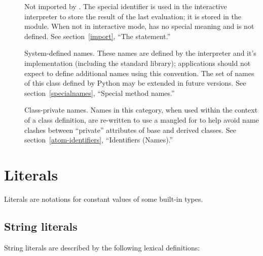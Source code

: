 \begin{description}

\item[\code{_*}]
  Not imported by .  The special
  identifier \samp{_} is used in the interactive interpreter to store
  the result of the last evaluation; it is stored in the
   module.  When not in interactive mode, \samp{_}
  has no special meaning and is not defined.
  See section~\ref{import}, ``The  statement.''


\item[\code{__*__}]
  System-defined names.  These names are defined by the interpreter
  and it's implementation (including the standard library);
  applications should not expect to define additional names using this
  convention.  The set of names of this class defined by Python may be
  extended in future versions.
  See section~\ref{specialnames}, ``Special method names.''

\item[\code{__*}]
  Class-private names.  Names in this category, when used within the
  context of a class definition, are re-written to use a mangled for
  to help avoid name clashes between ``private'' attributes of base
  and derived classes.
  See section~\ref{atom-identifiers}, ``Identifiers (Names).''

\end{description}


\section{Literals\label{literals}}

Literals are notations for constant values of some built-in types.


\subsection{String literals\label{strings}}

String literals are described by the following lexical definitions:

